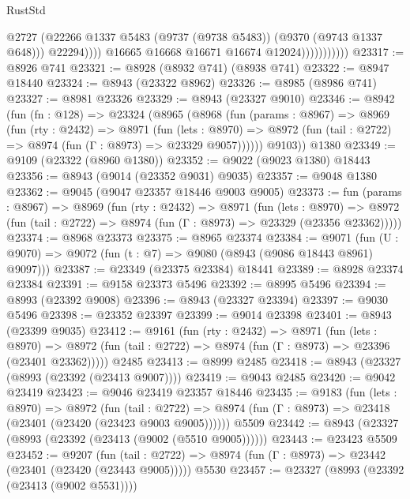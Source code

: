 \begin{lexlean}{RustStd}
\begin{coremodule}
{\begin{coremodule}
{{{{{{{{{{{{{{{{{{{{{{{{{{{{{{{{{{{{{{{                                  @2727
                                  (@22266
                                    @1337
                                    @5483
                                    (@9737 (@9738 @5483))
                                    (@9370 (@9743 @1337 @648)))
                                  @22294))))
                          @16665
                          @16668
                          @16671
                          @16674
                          @12024)))))))))))
@23317 := @8926 @741
@23321 := @8928 (@8932 @741) (@8938 @741)
@23322 := @8947 @18440
@23324 := @8943 (@23322 @8962)
@23326 := @8985 (@8986 @741)
@23327 := @8981 @23326
@23329 := @8943 (@23327 @9010)
@23346 := @8942
    (fun (fn : @128) =>
    @23324
      (@8965
        (@8968
          (fun (params : @8967) =>
          @8969
            (fun (rty : @2432) =>
            @8971
              (fun (lets : @8970) =>
              @8972 (fun (tail : @2722) => @8974 (fun (Γ : @8973) => @23329 @9057))))))
        @9103))
    @1380
@23349 := @9109 (@23322 (@8960 @1380))
@23352 := @9022 (@9023 @1380) @18443
@23356 := @8943 (@9014 (@23352 @9031) @9035)
@23357 := @9048 @1380
@23362 := @9045 (@9047 @23357 @18446 @9003 @9005)
@23373 := fun (params : @8967) =>
  @8969
    (fun (rty : @2432) =>
    @8971
      (fun (lets : @8970) =>
      @8972 (fun (tail : @2722) => @8974 (fun (Γ : @8973) => @23329 (@23356 @23362)))))
@23374 := @8968 @23373
@23375 := @8965 @23374
@23384 := @9071
    (fun (U : @9070) => @9072 (fun (t : @7) => @9080 (@8943 (@9086 @18443 @8961) @9097)))
@23387 := @23349 (@23375 @23384) @18441
@23389 := @8928 @23374 @23384
@23391 := @9158 @23373 @5496
@23392 := @8995 @5496
@23394 := @8993 (@23392 @9008)
@23396 := @8943 (@23327 @23394)
@23397 := @9030 @5496
@23398 := @23352 @23397
@23399 := @9014 @23398
@23401 := @8943 (@23399 @9035)
@23412 := @9161
    (fun (rty : @2432) =>
    @8971
      (fun (lets : @8970) =>
      @8972 (fun (tail : @2722) => @8974 (fun (Γ : @8973) => @23396 (@23401 @23362)))))
    @2485
@23413 := @8999 @2485
@23418 := @8943 (@23327 (@8993 (@23392 (@23413 @9007))))
@23419 := @9043 @2485
@23420 := @9042 @23419
@23423 := @9046 @23419 @23357 @18446
@23435 := @9183
    (fun (lets : @8970) =>
    @8972
      (fun (tail : @2722) =>
      @8974 (fun (Γ : @8973) => @23418 (@23401 (@23420 (@23423 @9003 @9005))))))
    @5509
@23442 := @8943 (@23327 (@8993 (@23392 (@23413 (@9002 (@5510 @9005))))))
@23443 := @23423 @5509
@23452 := @9207
    (fun (tail : @2722) => @8974 (fun (Γ : @8973) => @23442 (@23401 (@23420 (@23443 @9005)))))
    @5530
@23457 := @23327 (@8993 (@23392 (@23413 (@9002 @5531))))
}}}}}}}}}}}}}}}}}}}}}}}}}}}}}}}}}}}}}}}
\end{coremodule}}
\end{coremodule}
\end{lexlean}
